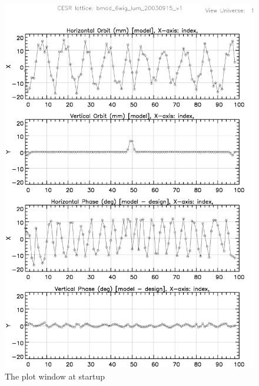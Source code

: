 \begin{figure}
  \centering
  \includegraphics[width=5in]{plot_page1.eps}
  \caption{The plot window at startup}
  \label{f:plot_begin}
\end{figure}

